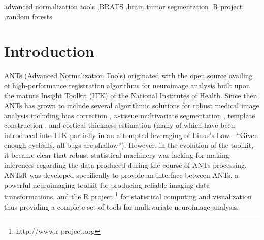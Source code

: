 \documentclass[final,5p,times,twocolumn]{elsarticle}
\begin{document}
\begin{frontmatter}
\begin{keyword}
advanced normalization tools \sep BRATS \sep brain tumor segmentation \sep R project \sep random forests
\end{keyword}

\end{frontmatter}

%
%
\newpage







%
%
%

\section{Introduction}

ANTs (Advanced Normalization Tools) originated with the open source availing
of high-performance registration algorithms for neuroimage analysis
\citep{avants2008a} built upon the mature Insight Toolkit (ITK)
of the National Institutes of Health.  Since then, ANTs has grown to include 
several algorithmic solutions for robust medical image analysis including bias 
correction \citep{tustison2010}, $n$-tissue multivariate segmentation 
\citep{avants2011}, template construction \citep{avants2010}, and cortical 
thickness estimation \citep{das2009} (many of which have been
introduced into ITK partially in an attempted leveraging of Linus's Law---``Given enough eyeballs, all bugs are shallow'').  
However, in the evolution of the toolkit, it became clear 
that robust statistical machinery was lacking for making inferences regarding
the data produced during the course of ANTs processing.  ANTsR was developed
specifically to provide an interface between ANTs, a 
powerful neuroimaging toolkit for producing reliable imaging data 
transformations, and the R project%
\footnote{
http://www.r-project.org
}
for statistical computing and visualization thus providing a complete
set of tools for multivariate neuroimage analysis. 
\end{document}
